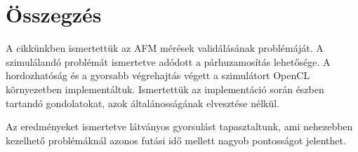 \section{Összegzés}
A cikkünkben ismertettük az AFM mérések validálásának problémáját.
A szimulálandó problémát ismertetve adódott a párhuzamosítás lehetősége.
A hordozhatóság és a gyorsabb végrehajtás végett a szimulátort OpenCL
környezetben implementáltuk.
Ismertettük az implementáció során észben tartandó gondolatokat, azok
általánosságának elvesztése nélkül.

Az eredményeket ismertetve látványos gyorsulást tapasztaltunk, ami nehezebben
kezelhető problémáknál azonos futási idő mellett nagyob pontosságot jelenthet.  


